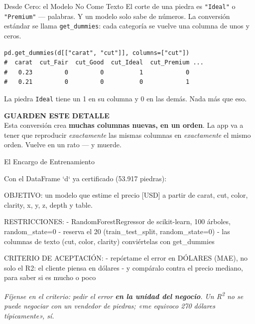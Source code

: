 \documentclass[aspectratio=169, 11pt]{beamer}
\begin{document}
\begin{frame}[fragile, shrink=5]{Desde Cero: el Modelo No Come Texto}
  \vspace{2pt}
  {\footnotesize\color{textMuted}
   El corte de una piedra es \texttt{"Ideal"} o \texttt{"Premium"} ---
   palabras. Y un modelo solo sabe de números. La conversión estándar se
   llama \texttt{get\_dummies}: cada categoría se vuelve una columna de
   unos y ceros.}
  \vspace{5pt}
  \begin{verbatim}
pd.get_dummies(d[["carat", "cut"]], columns=["cut"])
#  carat  cut_Fair  cut_Good  cut_Ideal  cut_Premium ...
#   0.23         0         0          1            0
#   0.21         0         0          0            1
  \end{verbatim}
  \vspace{5pt}
  {\footnotesize\color{textMuted}
   La piedra \texttt{Ideal} tiene un 1 en su columna y 0 en las demás. Nada
   más que eso.}
  \vspace{5pt}
  \begin{tcolorbox}[colback=arcaGray, colframe=arcaRed, boxrule=0pt,
    leftrule=3pt, arc=3pt, left=8pt, right=8pt, top=4pt, bottom=4pt]
    {\scriptsize\color{arcaRed}\bfseries GUARDEN ESTE DETALLE}\\[2pt]
    {\footnotesize\color{textMuted}
     Esta conversión crea \textbf{muchas columnas nuevas, en un orden}. La
     app va a tener que reproducir \emph{exactamente} las mismas columnas en
     \emph{exactamente} el mismo orden. Vuelve en un rato --- y muerde.}
  \end{tcolorbox}
\end{frame}

\begin{frame}[shrink=5]{El Encargo de Entrenamiento}
  \vspace{2pt}
  \begin{prompt}
Con el DataFrame `d` ya certificado (53.917 piedras):

OBJETIVO: un modelo que estime el precio [USD] a
partir de carat, cut, color, clarity, x, y, z,
depth y table.

RESTRICCIONES:
- RandomForestRegressor de scikit-learn, 100 árboles,
  random_state=0
- reserva el 20%
  (train_test_split, random_state=0)
- las columnas de texto (cut, color, clarity)
  conviértelas con get_dummies

CRITERIO DE ACEPTACIÓN:
- repórtame el error en DÓLARES (MAE), no solo el R2:
  el cliente piensa en dólares
- y compáralo contra el precio mediano, para saber
  si es mucho o poco
  \end{prompt}
  \vspace{4pt}
  {\scriptsize\color{arcaDark}\itshape
   Fíjense en el criterio: pedir el error \textbf{en la unidad del negocio}.
   Un R\textsuperscript{2} no se puede negociar con un vendedor de piedras;
   «me equivoco 270 dólares típicamente», sí.}
\end{frame}
\end{document}
